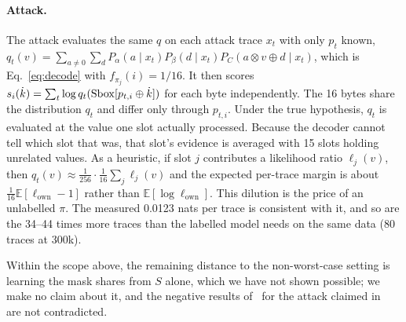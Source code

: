\paragraph{Attack.}
The attack evaluates the same $q$ on each attack trace $x_t$ with only $p_t$ known,
$q_t(v)=\sum_{a\neq0}\sum_d P_\alpha(a\mid x_t)P_\beta(d\mid x_t)P_C(a\otimes v\oplus d\mid x_t)$, which is
Eq.~\eqref{eq:decode} with $f_{\pi_j}(i)=1/16$. It then scores
$s_i(\dot k)=\sum_t\log q_t(\mathrm{Sbox}[p_{t,i}\oplus\dot k])$ for each byte independently. The 16 bytes share the
distribution $q_t$ and differ only through $p_{t,i}$. Under the true hypothesis, $q_t$ is evaluated at the
value one slot actually processed. Because the decoder cannot tell which slot that was, that slot's evidence
is averaged with 15 slots holding unrelated values. As a heuristic, if slot $j$ contributes a likelihood ratio
$\ell_j(v)$, then $q_t(v)\approx\frac1{256}\cdot\frac1{16}\sum_j\ell_j(v)$ and the expected per-trace margin is
about $\frac1{16}\mathbb E[\ell_{\mathrm{own}}-1]$ rather than $\mathbb E[\log\ell_{\mathrm{own}}]$. This dilution
is the price of an unlabelled $\pi$. The measured 0.0123 nats per trace is consistent with it, and so are the
34--44 times more traces than the labelled model needs on the same data (80 traces at 300k).


Within the scope above, the remaining distance to the non-worst-case setting is learning the mask
shares from $S$ alone, which we have not shown possible; we make no claim about it, and the negative
results of~\cite{ReallyBroken} for the attack claimed in~\cite{Scoop} are not contradicted.
